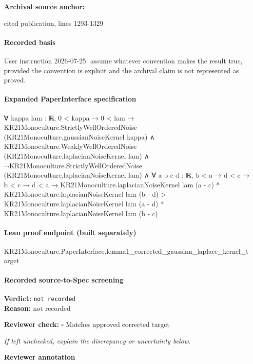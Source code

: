 \documentclass[10pt]{article}
\newcommand{\reviewerbox}{%
  \par\noindent\fbox{\parbox{0.96\linewidth}{\rule{0pt}{0.38in}}}\par
}
\newcommand{\reviewmatch}[1]{%
  \par\noindent\textbf{Reviewer check:} $\square$\; #1\par
  \noindent\emph{If left unchecked, explain the discrepancy or uncertainty below.}\par
}
\begin{document}
\textbf{Archival source anchor:} {\footnotesize\raggedright cited publication, lines 1293-\allowbreak{}1329\par}
\paragraph{Recorded basis}
User instruction 2026-\allowbreak{}07-\allowbreak{}25:\allowbreak{} assume whatever convention makes the result true, provided the convention is explicit and the archival claim is not represented as proved.\allowbreak{}
\paragraph{Expanded PaperInterface specification}
\begin{ReviewVerbatim}
∀ {kappa lam : ℝ},
  0 < kappa →
    0 < lam →
      KR21Monoculture.StrictlyWellOrderedNoise (KR21Monoculture.gaussianNoiseKernel kappa) ∧
        KR21Monoculture.WeaklyWellOrderedNoise (KR21Monoculture.laplacianNoiseKernel lam) ∧
          ¬KR21Monoculture.StrictlyWellOrderedNoise (KR21Monoculture.laplacianNoiseKernel lam) ∧
            ∀ {a b c d : ℝ},
              b < a →
                d < c →
                  b < c →
                    d < a →
                      KR21Monoculture.laplacianNoiseKernel lam (a - c) *
                          KR21Monoculture.laplacianNoiseKernel lam (b - d) >
                        KR21Monoculture.laplacianNoiseKernel lam (a - d) *
                          KR21Monoculture.laplacianNoiseKernel lam (b - c)
\end{ReviewVerbatim}

\paragraph{Lean proof endpoint (built separately)}\begin{ReviewVerbatim}
KR21Monoculture.PaperInterface.lemma1_corrected_gaussian_laplace_kernel_target
\end{ReviewVerbatim}

\paragraph{Recorded source-to-Spec screening}
\textbf{Verdict:} \texttt{not recorded}
\\
\textbf{Reason:} not recorded
\reviewmatch{Matches approved corrected target}
\noindent\textbf{Reviewer annotation}\par
\reviewerbox
\clearpage
\hypertarget{source-claim-e077005933af7923}{}
\end{document}
